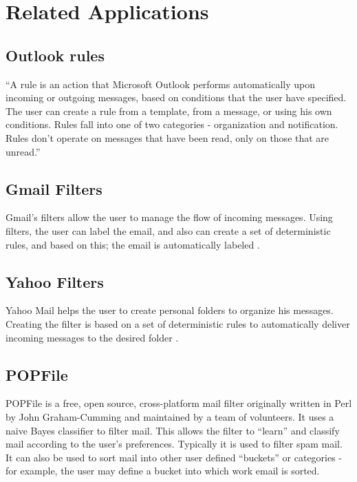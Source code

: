 \section{Related Applications}
\label{sec:related_apps}

\subsection{Outlook rules}
``A rule is an action that Microsoft Outlook performs automatically upon incoming or outgoing 
messages, based on conditions that the user have specified. The user can create a rule 
from a template, from a message, or using his own conditions. Rules fall into one of 
two categories - organization and notification. Rules don't operate on messages that 
have been read, only on those that are unread.'' \cite{OUTLOOK_REF}

\subsection{Gmail Filters}
Gmail's filters allow the user to manage the flow of incoming messages. Using filters, 
the user can label the email, and also can create a set of deterministic rules, and 
based on this; the email is automatically labeled \cite{GMAIL_FILTERS}.

\subsection{Yahoo Filters}
Yahoo Mail helps the user to create personal folders to organize his messages. 
Creating the filter is based on a set of deterministic rules to automatically deliver 
incoming messages to the desired folder \cite{YAHOO_FILTERS}.

\subsection{POPFile}
POPFile is a free, open source, cross-platform mail filter originally written in 
Perl by John Graham-Cumming and maintained by a team of volunteers. It uses a 
naive Bayes classifier to filter mail. This allows the filter to ``learn'' and 
classify mail according to the user's preferences. Typically it is used to filter 
spam mail. It can also be used to sort mail into other user defined ``buckets'' 
or categories - for example, the user may define a bucket into which work email 
is sorted.

